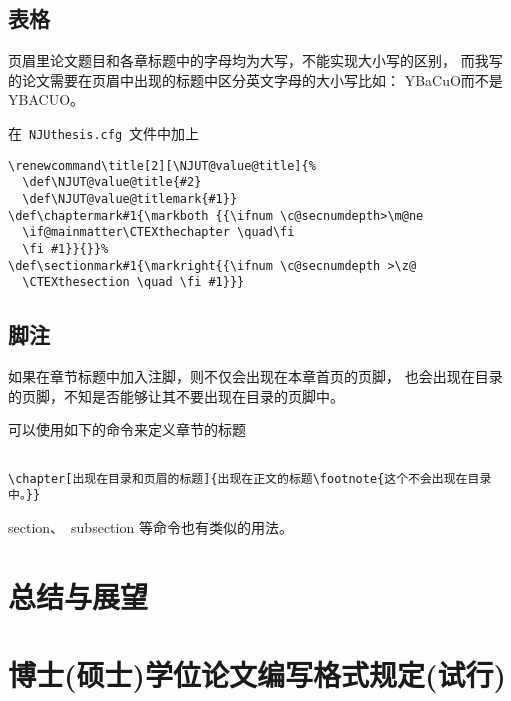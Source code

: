 \documentclass[oneside, phd]{njuthesis}
\begin{document}
\section{表格}

\begin{FAQ}
页眉里论文题目和各章标题中的字母均为大写，不能实现大小写的区别，
而我写的论文需要在页眉中出现的标题中区分英文字母的大小写比如：
YBaCuO而不是YBACUO。
\end{FAQ}

\begin{ANS}
在~\texttt{NJUthesis.cfg}~文件中加上
\begin{verbatim}
\renewcommand\title[2][\NJUT@value@title]{%
  \def\NJUT@value@title{#2}
  \def\NJUT@value@titlemark{#1}}
\def\chaptermark#1{\markboth {{\ifnum \c@secnumdepth>\m@ne
  \if@mainmatter\CTEXthechapter \quad\fi
  \fi #1}}{}}%
\def\sectionmark#1{\markright{{\ifnum \c@secnumdepth >\z@
  \CTEXthesection \quad \fi #1}}}
\end{verbatim}
\end{ANS}


\section{脚注}

\begin{FAQ}
如果在章节标题中加入注脚，则不仅会出现在本章首页的页脚，
也会出现在目录的页脚，不知是否能够让其不要出现在目录的页脚中。
\end{FAQ}

\begin{ANS}
可以使用如下的命令来定义章节的标题

\begin{verbatim}

\chapter[出现在目录和页眉的标题]{出现在正文的标题\footnote{这个不会出现在目录中。}}

\end{verbatim}
section、~subsection 等命令也有类似的用法。
\end{ANS}

\chapter{总结与展望}
\label{C:CONC}

\appendix

\chapter{博士(硕士)学位论文编写格式规定(试行)}
\end{document}
